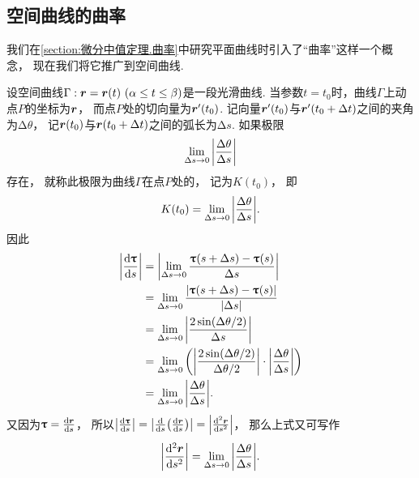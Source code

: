 \subsection{空间曲线的曲率}
我们在\cref{section:微分中值定理.曲率}中研究平面曲线时引入了“曲率”这样一个概念，
现在我们将它推广到空间曲线.

设空间曲线\(\Gamma: \vb{r} = \vb{r}(t)\ (\alpha \leq t \leq \beta)\)是一段光滑曲线.
当参数\(t = t_0\)时，曲线\(\Gamma\)上动点\(P\)的坐标为\(\boldsymbol{r}\)，
而点\(P\)处的切向量为\(\boldsymbol{r}'(t_0)\).
记向量\(\boldsymbol{r}'(t_0)\)与\(\boldsymbol{r}'(t_0+\Delta t)\)之间的夹角为\(\increment\theta\)，
记\(\boldsymbol{r}(t_0)\)与\(\boldsymbol{r}(t_0+\Delta t)\)之间的弧长为\(\increment s\).
如果极限\[
	\lim_{\Delta s \to 0} \abs{ \frac{\Delta\theta}{\Delta s} }
\]存在，
就称此极限为曲线\(\Gamma\)在点\(P\)处的，
记为\(K(t_0)\)，
即\[
	K(t_0)
	= \lim_{\Delta s \to 0} \abs{ \frac{\Delta\theta}{\Delta s} }.
\]
因此\begin{align*}
	\abs{ \dv{\boldsymbol{\uptau}}{s} }
	&= \abs{
			\lim_{\Delta s \to 0}
				\frac{\boldsymbol{\uptau}(s+\Delta s) - \boldsymbol{\uptau}(s)}{\Delta s}
		} \\
	&= \lim_{\Delta s \to 0}
		\frac{\abs{\boldsymbol{\uptau}(s+\Delta s) - \boldsymbol{\uptau}(s)}}{\abs{\Delta s}} \\
	&= \lim_{\Delta s \to 0}
		\abs{ \frac{2 \sin(\Delta\theta / 2)}{\Delta s} } \\
	&= \lim_{\Delta s \to 0}
		\left(
			\abs{ \frac{2 \sin(\Delta\theta / 2)}{\Delta\theta/2} }
			\cdot \abs{ \frac{\Delta\theta}{\Delta s} }
		\right) \\
	&= \lim_{\Delta s \to 0}
		\abs{ \frac{\Delta\theta}{\Delta s} }.
\end{align*}
又因为\(\boldsymbol{\uptau} = \dv{\boldsymbol{r}}{s}\)，
所以\(\abs{ \dv{\boldsymbol{\uptau}}{s} }
= \abs{ \dv{s}( \dv{\boldsymbol{r}}{s} ) }
= \abs{ \dv[2]{\boldsymbol{r}}{s} }\)，
那么上式又可写作\begin{equation}
	\abs{ \dv[2]{\boldsymbol{r}}{s} }
	= \lim_{\Delta s \to 0} \abs{ \frac{\Delta\theta}{\Delta s} }.
\end{equation}

